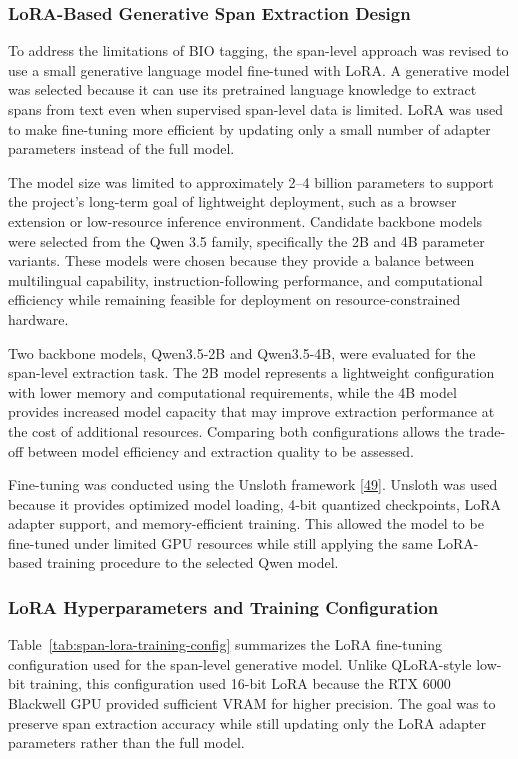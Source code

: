 \documentclass[12pt,oneside,openright,a4paper]{cpe-english-project}
\begin{document}
\subsubsection{LoRA-Based Generative Span Extraction Design}

To address the limitations of BIO tagging, the span-level approach was revised to use a small generative language model fine-tuned with LoRA. A generative model was selected because it can use its pretrained language knowledge to extract spans from text even when supervised span-level data is limited. LoRA was used to make fine-tuning more efficient by updating only a small number of adapter parameters instead of the full model.

The model size was limited to approximately 2–4 billion parameters to support the project’s long-term goal of lightweight deployment, such as a browser extension or low-resource inference environment. Candidate backbone models were selected from the Qwen 3.5 family, specifically the 2B and 4B parameter variants. These models were chosen because they provide a balance between multilingual capability, instruction-following performance, and computational efficiency while remaining feasible for deployment on resource-constrained hardware.

Two backbone models, Qwen3.5-2B and Qwen3.5-4B, were evaluated for the span-level extraction task. The 2B model represents a lightweight configuration with lower memory and computational requirements, while the 4B model provides increased model capacity that may improve extraction performance at the cost of additional resources. Comparing both configurations allows the trade-off between model efficiency and extraction quality to be assessed.

Fine-tuning was conducted using the Unsloth framework \hyperlink{bib:ref49}{[49]}. Unsloth was used because it provides optimized model loading, 4-bit quantized checkpoints, LoRA adapter support, and memory-efficient training. This allowed the model to be fine-tuned under limited GPU resources while still applying the same LoRA-based training procedure to the selected Qwen model.

\subsubsection{LoRA Hyperparameters and Training Configuration}

Table~\ref{tab:span-lora-training-config} summarizes the LoRA fine-tuning configuration used for the span-level generative model. Unlike QLoRA-style low-bit training, this configuration used 16-bit LoRA because the RTX 6000 Blackwell GPU provided sufficient VRAM for higher precision. The goal was to preserve span extraction accuracy while still updating only the LoRA adapter parameters rather than the full model.
\end{document}
